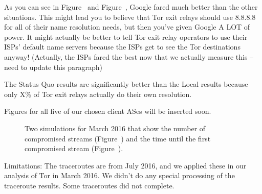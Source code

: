 
As you can see in Figure~ and
Figure~, 
Google fared much better than the other situations. This might lead you to believe that 
Tor exit relays should use 8.8.8.8 for all of their name resolution needs, but then you've 
given Google A LOT of power. It might actually be better to tell Tor exit relay operators 
to use their ISPs' default name servers because the ISPs get to see the Tor destinations 
anyway! (Actually, the ISPs fared the best now that we actually measure this
--need to update this paragraph)

The Status Quo results are significantly better than the Local results because only X\% 
of Tor exit relays actually do their own resolution.

Figures for all five of our chosen client ASes will be inserted soon.

\begin{figure}[t]
\centering
{}
\caption{Two simulations for March 2016 that show the number of compromised
	streams (Figure~) and the time until the
	first compromised stream (Figure~).}
\label{fig:compromise-stream-time}
\end{figure}

Limitations: The traceroutes are from July 2016, and we applied these in our analysis of Tor 
in March 2016.  We didn't do any special processing of the traceroute results.  Some traceroutes 
did not complete.  
